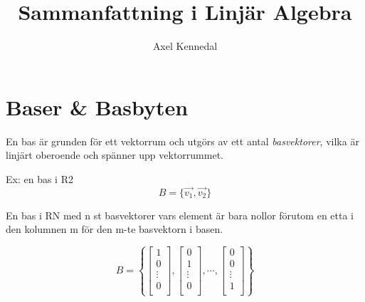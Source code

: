 \documentclass[11pt]{article}
\author{Axel Kennedal} %
\title{Sammanfattning i Linjär Algebra}
\begin{document}
\maketitle
\tableofcontents
\newpage

\section{Baser \& Basbyten}
En bas är grunden för ett vektorrum och utgörs av ett antal \emph{basvektorer}, vilka är linjärt oberoende och spänner upp vektorrummet.

Ex: en bas i R2
$$
B = \{\vec{v_{1}}, \vec{v_{2}} \}
$$

En bas i RN med n st basvektorer vars element är bara nollor förutom en etta i den kolumnen m för den m-te basvektorn i basen.

\begin{equation}
B = \left \{
\begin{bmatrix}
1 \\
0 \\
\vdots \\
0 \\
\end{bmatrix}
,
\begin{bmatrix}
0 \\
1 \\
\vdots \\
0 \\
\end{bmatrix}
, \cdots
,
\begin{bmatrix}
0 \\
0 \\
\vdots \\
1 \\
\end{bmatrix}
\right \}
\end{equation}
\end{document}

